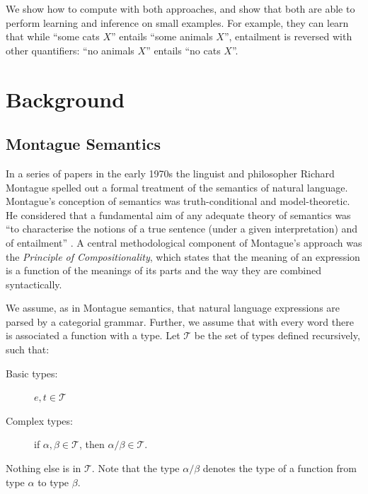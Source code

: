 \documentclass[11pt]{article}
\theoremstyle{definition}
\begin{document}
We show how to compute with both approaches, and show that both are
able to perform learning and inference on small examples. For example,
they can learn that while ``some cats $X$'' entails ``some animals
$X$'', entailment is reversed with other quantifiers: ``no animals
$X$'' entails ``no cats $X$''.




\section{Background}

\subsection{Montague Semantics}

In a series of papers in the early 1970s \cite{Montague1970a,Montague1970b,Montague1973} the linguist and philosopher Richard Montague spelled out a formal treatment of the semantics of natural language. Montague's conception of semantics was truth-conditional and model-theoretic. He considered that a fundamental aim of any adequate theory of semantics was ``to characterise the notions of a true sentence (under a given interpretation) and of entailment'' \cite{Montague1970b}. A central methodological component of Montague's approach was the {\em Principle of Compositionality\/}, which states that the meaning of an expression is a function of the meanings of its parts and the way they are combined syntactically.


We assume, as in Montague semantics, that natural language expressions
are parsed by a categorial grammar. Further, we assume that with every word there is
associated a function with a type. Let $\mathcal{T}$ be the set of types defined
recursively, such that:
\begin{description}
\item [Basic types:] $e,t\in \mathcal{T}$
\item[Complex types:]  if $\alpha, \beta\in \mathcal{T}$, then $\alpha/\beta\in \mathcal{T}$.
\end{description}
Nothing else is in $\mathcal{T}$. Note that the type $\alpha/\beta$ denotes the type of a function from type
$\alpha$ to type $\beta$.
\end{document}

